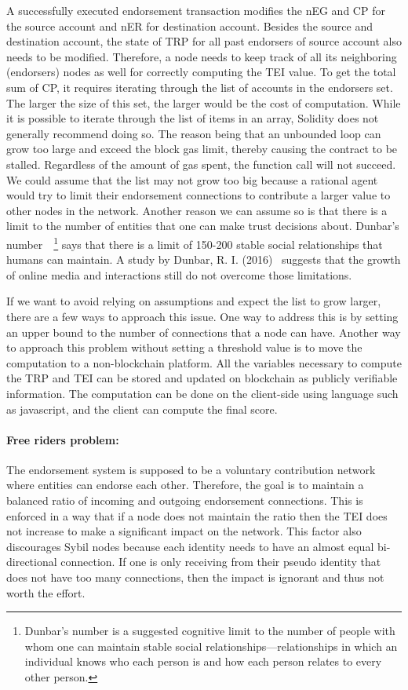 A successfully executed endorsement transaction modifies the \ac{nEG} and
\ac{CP} for the source account and \ac{nER} for destination account. Besides
the source and destination account, the state of \ac{TRP} for all past
endorsers of source account also needs to be modified. Therefore, a node needs
to keep track of all its neighboring (endorsers) nodes as well for correctly
computing the \ac{TEI} value. To get the total sum of \ac{CP}, it requires
iterating through the list of accounts in the endorsers set. The larger the
size of this set, the larger would be the cost of computation. While it is
possible to iterate through the list of items in an array, Solidity does not
generally recommend doing so. The reason being that an unbounded loop can grow
too large and exceed the block gas limit, thereby causing the contract to be
stalled. Regardless of the amount of gas spent, the function call will not
succeed. We could assume that the list may not grow too big because a rational
agent would try to limit their endorsement connections to contribute a larger
value to other nodes in the network. Another reason we can assume so is that
there is a limit to the number of entities that one can make trust decisions
about. Dunbar's number~\cite{hill2003social}~\footnote{Dunbar's number is a
suggested cognitive limit to the number of people with whom one can maintain
stable social relationships—relationships in which an individual knows who each
person is and how each person relates to every other person.} says that there
is a limit of 150-200 stable social relationships that humans can maintain. A
study by Dunbar, R. I. (2016)~\cite{dunbar2016online} suggests that the growth
of online media and interactions still do not overcome those limitations. \par 

If we want to avoid relying on assumptions and expect the list to grow larger,
there are a few ways to approach this issue. One way to address this is by
setting an upper bound to the number of connections that a node can have.
Another way to approach this problem without setting a threshold value is to
move the computation to a non-blockchain platform. All the variables necessary
to compute the \ac{TRP} and \ac{TEI} can be stored and updated on blockchain as
publicly verifiable information. The computation can be done on the client-side
using language such as javascript, and the client can compute the final score.

\paragraph{Free riders problem:} The endorsement system is supposed to be a
voluntary contribution network where entities can endorse each other.
Therefore, the goal is to maintain a balanced ratio of incoming and outgoing
endorsement connections. This is enforced in a way that if a node does not
maintain the ratio then the \ac{TEI} does not increase to make a significant
impact on the network. This factor also discourages Sybil nodes because each
identity needs to have an almost equal bi-directional connection. If one is
only receiving from their pseudo identity that does not have too many
connections, then the impact is ignorant and thus not worth the effort.
